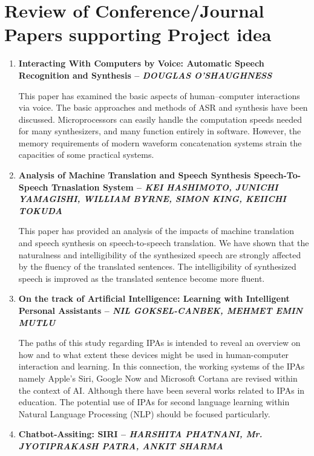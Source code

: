 \documentclass[16pt,oneside,a4paper]{article}
\begin{document}
\section{Review of Conference/Journal Papers supporting Project idea}
\label{sec:survey}
\begin{enumerate}
\item \textbf{Interacting With Computers by Voice: Automatic Speech Recognition and Synthesis -- \textit{DOUGLAS O’SHAUGHNESS}}\

This paper has examined the basic aspects of human–computer interactions via voice. The basic approaches and methods of ASR and synthesis have been discussed. Microprocessors can easily handle the computation speeds needed for many synthesizers, and many function entirely in software. However, the memory requirements of modern waveform concatenation systems strain the capacities of some practical systems.\\

\item \textbf{Analysis of Machine Translation and Speech Synthesis Speech-To-Speech Trnaslation System -- \textit{KEI HASHIMOTO, JUNICHI YAMAGISHI, WILLIAM BYRNE, SIMON KING, KEIICHI TOKUDA}}

This paper has provided an analysis of the impacts of machine translation and speech synthesis on speech-to-speech translation. We have shown that the naturalness and intelligibility of the synthesized speech are strongly affected by the fluency of the translated sentences. The intelligibility of synthesized speech is improved as the translated sentence become more ﬂuent.\\

\item \textbf{On the track of Artificial Intelligence: Learning with Intelligent Personal Assistants -- \textit{NIL GOKSEL-CANBEK, MEHMET EMIN MUTLU}}

The paths of this study regarding IPAs is intended to reveal an overview on how and to what extent these devices might be used in human-computer interaction and learning. In this connection, the working systems of the IPAs namely Apple’s Siri, Google Now and Microsoft Cortana are revised within the context of AI. Although there have been several works related to IPAs in education. The potential use of IPAs for second language learning within Natural Language Processing (NLP) should be focused particularly.\\

\item \textbf{Chatbot-Assiting: SIRI -- \textit{HARSHITA PHATNANI, Mr. JYOTIPRAKASH PATRA, ANKIT SHARMA}}


\end{enumerate}
\end{document}
